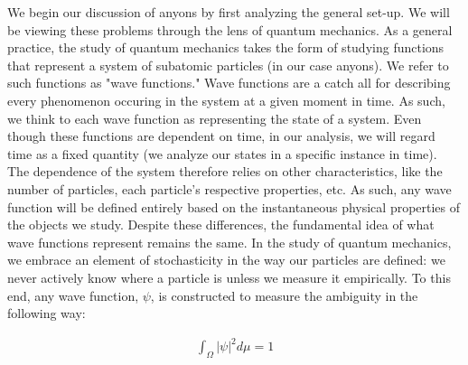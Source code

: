 \documentclass[10pt]{ucthesis}
\begin{document}
We begin our discussion of anyons by first analyzing the general set-up. We will be viewing these problems through the lens of quantum mechanics. As a general practice, the study of quantum mechanics takes the form of studying functions that represent a system of subatomic particles (in our case anyons). We refer to such functions as "wave functions." Wave functions are a catch all for describing every phenomenon occuring in the system at a given moment in time. As such, we think to each wave function as representing the state of a system. Even though these functions are dependent on time, in our analysis, we will regard time as a fixed quantity (we analyze our states in a specific instance in time). The dependence of the system therefore relies on other characteristics, like the number of particles, each particle's respective properties, etc. As such, any wave function will be defined entirely based on the instantaneous physical properties of the objects we study. Despite these differences, the fundamental idea of what wave functions represent remains the same. In the study of quantum mechanics, we embrace an element of stochasticity in the way our particles are defined: we never actively know where a particle is unless we measure it empirically. To this end, any wave function, $\psi$, is constructed to measure the ambiguity in the following way:

\begin{equation}
	\begin{aligned}
		\int_\Omega |\psi|^2 d\mu = 1
	\end{aligned}
\end{equation}
\end{document}
